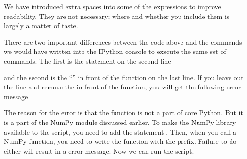\documentclass[letterpaper,10pt,english]{sphinxmanual}
\begin{document}
\sphinxAtStartPar
We have introduced extra spaces into some of the expressions to improve readability.  They are not necessary; where and whether you include them is largely a matter of taste.

\sphinxAtStartPar
There are two important differences between the code above and the commands we would have written into the IPython console to execute the same set of commands.  The first is the statement on the second line

\begin{sphinxVerbatim}[commandchars=\\\{\}]
   
\end{sphinxVerbatim}

\sphinxAtStartPar
and the second is the “” in front of the  function on the last line.  If you leave out the  line and remove the  in front of the  function, you will get the following error message

\begin{sphinxVerbatim}[commandchars=\\\{\}]

\end{sphinxVerbatim}

\sphinxAtStartPar
The reason for the error is that the  function is not a part of core Python.  But it is a part of the NumPy module discussed earlier.  To make the NumPy library available to the script, you need to add the statement .  Then, when you call a NumPy function, you need to write the function with the  prefix.  Failure to do either will result in a error message.  Now we can run the script.

\begin{sphinxVerbatim}[commandchars=\\\{\}]
 

\end{sphinxVerbatim}
\end{document}
